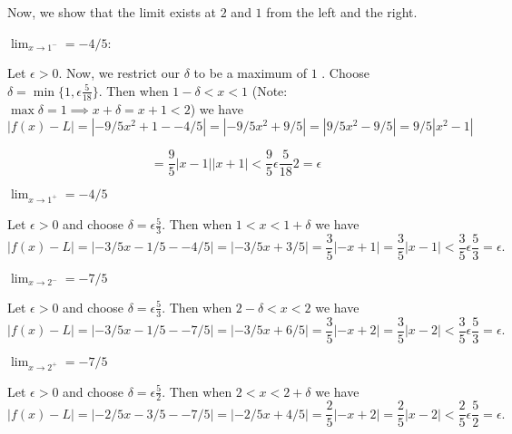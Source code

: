 \documentclass{report}
\begin{document}
Now, we show that the limit exists at $2$ and $1$ from the left and the right.

\bigskip
\begin{myproof}
   $\lim_{x \rightarrow 1^-} = -4/5 $:\par 
   Let $\epsilon > 0$. Now, we restrict our $\delta$ to be a maximum of $1$ . Choose $\delta = \min\{1, \epsilon \frac{5}{18}\} $. Then when  $1 - \delta < x < 1$ (Note: $\max{\delta} = 1 \implies x+\delta = x+ 1 < 2$) we have $$|f(x) - L| =|-9/5 x^2+1 - -4/5| = |-9/5 x^2 + 9/5 | = |9/5 x^2 - 9/5 | =9/5|x^2 -1|$$

   $$ = \frac{9}{5}|x -1||x+1| < \frac{9}{5} \epsilon \frac{5}{18}2 = \epsilon $$
\end{myproof}

\begin{myproof}
   $\lim_{x \rightarrow 1^+} = -4/5$\par

 Let $\epsilon > 0$ and choose $\delta = \epsilon \frac{5}{3}  $. Then when  $1  < x < 1 + \delta$ we have $$|f(x) - L| = |-3/5 x - 1/5 - -4/5| = |-3/5x + 3/5| = \frac{3}{5}|-x+1|= \frac{3}{5}|x-1| < \frac{3}{5} \epsilon \frac{5}{3}   = \epsilon.$$
\end{myproof}

\begin{myproof}
    
   $\lim_{x \rightarrow 2^-} = -7/5$\par

 Let $\epsilon > 0$ and choose $\delta = \epsilon \frac{5}{3}  $. Then when  $2 - \delta  < x < 2$ we have $$|f(x) - L| = |-3/5 x - 1/5 - -7/5| = |-3/5x + 6/5| = \frac{3}{5}|-x+2|= \frac{3}{5}|x-2| < \frac{3}{5} \epsilon \frac{5}{3}   = \epsilon.$$
\end{myproof}


\begin{myproof}
    
   $\lim_{x \rightarrow 2^+} = -7/5$\par

 Let $\epsilon > 0$ and choose $\delta = \epsilon \frac{5}{2}  $. Then when  $2  < x < 2 + \delta$ we have $$|f(x) - L| = |-2/5 x - 3/5 - -7/5| = |-2/5x + 4/5| = \frac{2}{5}|-x+2|= \frac{2}{5}|x-2| < \frac{2}{5} \epsilon \frac{5}{2}   = \epsilon.$$
\end{myproof}
\end{document}
